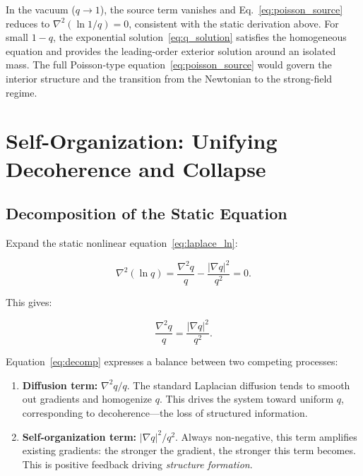 \documentclass[aps,prd,twocolumn,showpacs,superscriptaddress,preprintnumbers]{revtex4-2}
\begin{document}
In the vacuum ($q\to1$), the source term vanishes and Eq.~\eqref{eq:poisson_source} reduces to $\nabla^2(\ln 1/q)=0$, consistent with the static derivation above.
For small $1-q$, the exponential solution~\eqref{eq:q_solution} satisfies the homogeneous equation and provides the leading-order exterior solution around an isolated mass.
The full Poisson-type equation~\eqref{eq:poisson_source} would govern the interior structure and the transition from the Newtonian to the strong-field regime.

\section{Self-Organization: Unifying Decoherence and Collapse}
\label{sec:selforg}

\subsection{Decomposition of the Static Equation}

Expand the static nonlinear equation~\eqref{eq:laplace_ln}:

\begin{equation}
\nabla^2(\ln q) = \frac{\nabla^2 q}{q} - \frac{|\nabla q|^2}{q^2} = 0.
\label{eq:expand_ln}
\end{equation}

This gives:

\begin{equation}
\boxed{\frac{\nabla^2 q}{q} = \frac{|\nabla q|^2}{q^2}}.
\label{eq:decomp}
\end{equation}

Equation~\eqref{eq:decomp} expresses a balance between two competing processes:

\begin{enumerate}
    \item \textbf{Diffusion term:} $\nabla^2 q/q$. The standard Laplacian diffusion tends to smooth out gradients and homogenize $q$. This drives the system toward uniform $q$, corresponding to decoherence---the loss of structured information.

    \item \textbf{Self-organization term:} $|\nabla q|^2/q^2$. Always non-negative, this term amplifies existing gradients: the stronger the gradient, the stronger this term becomes. This is positive feedback driving \emph{structure formation}.
\end{enumerate}
\end{document}

